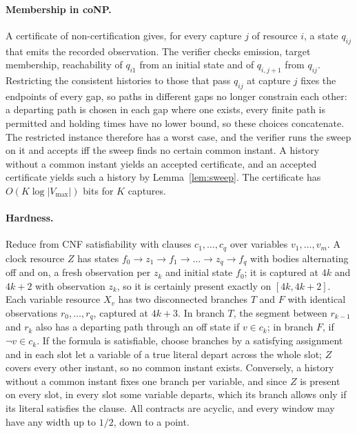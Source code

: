 \paragraph{Membership in coNP.} A certificate of non-certification gives, for
every capture $j$ of resource $i$, a state $q_{ij}$ that emits the recorded
observation. The verifier checks emission, target membership, reachability of
$q_{i1}$ from an initial state and of $q_{i,j+1}$ from $q_{ij}$. Restricting the
consistent histories to those that pass $q_{ij}$ at capture $j$ fixes the
endpoints of every gap, so paths in different gaps no longer constrain each
other: a departing path is chosen in each gap where one exists, every finite
path is permitted and holding times have no lower bound, so these choices
concatenate. The restricted instance therefore has a worst case, and the
verifier runs the sweep on it and accepts iff the sweep finds no certain
common instant. A history without a common instant yields an accepted
certificate, and an accepted certificate yields such a history by
Lemma~\ref{lem:sweep}. The certificate has $O(K\log|V_{\max}|)$ bits for $K$
captures.

\paragraph{Hardness.} Reduce from CNF satisfiability with clauses
$c_1,\dots,c_q$ over variables $v_1,\dots,v_m$. A clock resource $Z$ has states
$f_0\to z_1\to f_1\to\dots\to z_q\to f_q$ with bodies alternating off and on, a
fresh observation per $z_k$ and initial state $f_0$; it is captured at $4k$ and
$4k+2$ with observation $z_k$, so it is certainly present exactly on
$[4k,4k+2]$. Each variable resource $X_v$ has two disconnected branches $T$ and
$F$ with identical observations $r_0,\dots,r_q$, captured at $4k+3$. In branch
$T$, the segment between $r_{k-1}$ and $r_k$ also has a departing path through
an off state if $v\in c_k$; in branch $F$, if $\lnot v\in c_k$. If the formula is
satisfiable, choose branches by a satisfying assignment and in each slot let a
variable of a true literal depart across the whole slot; $Z$ covers every
other instant, so no common instant exists. Conversely, a history without a
common instant fixes one branch per variable, and since $Z$ is present on every
slot, in every slot some variable departs, which its branch allows only if its
literal satisfies the clause. All contracts are acyclic, and every window may
have any width up to $1/2$, down to a point.

